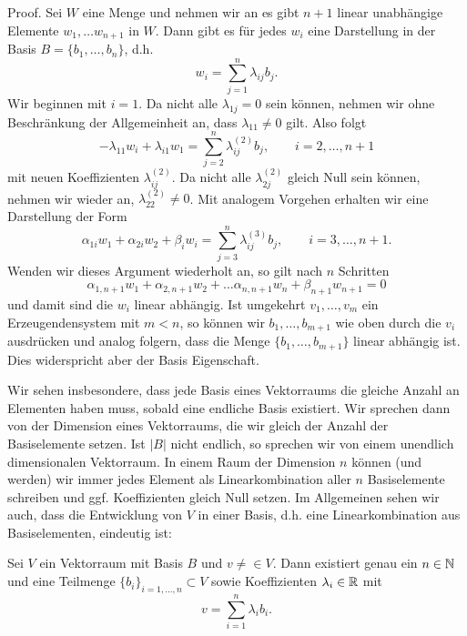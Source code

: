 \begin{emphBox}{}{}
Proof.  Sei \(W\) eine  Menge und nehmen wir an es gibt \(n+1\) linear unabhängige Elemente \(w_1, \ldots w_{n+1}\) in \(W\). Dann gibt es für jedes \(w_i\) eine Darstellung in der Basis \(B=\{b_1,\ldots,b_n\}\), d.h.
\begin{equation*}
 w_i =  \sum_{j=1}^n \lambda_{ij} b_j.
\end{equation*}
Wir beginnen mit \(i=1\). Da nicht alle \(\lambda_{1j} =0 \) sein können, nehmen wir ohne Beschränkung der Allgemeinheit an, dass \(\lambda_{11} \neq 0\) gilt. Also folgt
\begin{equation*}
 - \lambda_{11} w_i + \lambda_{i1} w_1 = \sum_{j=2}^n \lambda_{ij}^{(2)}  b_j, \qquad i=2,\ldots,n+1
\end{equation*}
mit neuen Koeffizienten \(\lambda_{ij}^{(2)}\). Da nicht alle \(\lambda_{2j}^{(2)} \) gleich Null sein können, nehmen wir wieder an, \(\lambda_{22}^{(2)} \neq 0\). Mit analogem Vorgehen erhalten wir eine Darstellung der Form
\begin{equation*}
 \alpha_{1i} w_1 + \alpha_{2i} w_2 + \beta_i w_i = \sum_{j=3}^n \lambda_{ij}^{(3)}  b_j, \qquad i=3,\ldots,n+1.
\end{equation*}
Wenden wir dieses Argument wiederholt an, so gilt nach \(n\) Schritten
\begin{equation*}
 \alpha_{1,n+1} w_1 + \alpha_{2,n+1} w_2 + \ldots \alpha_{n,n+1} w_n + \beta_{n+1} w_{n+1} = 0
\end{equation*}
und damit sind die \(w_i\) linear abhängig.
Ist umgekehrt \(v_1, \ldots, v_m\) ein Erzeugendensystem mit \(m<n\), so können wir \(b_1,\ldots,b_{m+1}\) wie oben durch die \(v_i\) ausdrücken und analog folgern, dass die Menge \(\{b_1,\ldots,b_{m+1}\}\) linear abhängig ist. Dies widerspricht aber der Basis Eigenschaft.
\end{emphBox}

Wir sehen insbesondere, dass jede Basis eines Vektorraums die gleiche Anzahl an Elementen haben muss, sobald eine endliche Basis existiert. Wir sprechen dann von der Dimension eines Vektorraums, die wir gleich der Anzahl der Basiselemente setzen. Ist \(|B|\) nicht endlich, so sprechen wir von einem unendlich dimensionalen Vektorraum. In einem Raum der Dimension \(n\) können (und werden) wir immer jedes Element als Linearkombination aller \(n\) Basiselemente schreiben und ggf. Koeffizienten gleich Null setzen.
Im Allgemeinen sehen wir auch, dass die Entwicklung von \(V\) in einer Basis, d.h. eine Linearkombination aus Basiselementen, eindeutig ist:
\label{vektorraeume/vektorraeume:theorem-11}
\begin{theorem}{}{}



Sei \(V\) ein Vektorraum mit Basis \(B\) und \(v \neq \in V\). Dann existiert genau ein \(n \in \mathbb{N}\) und eine Teilmenge \(\{b_i\}_{i=1,\ldots,n} \subset V\) sowie Koeffizienten \(\lambda_i \in \mathbb{R}\) mit
\begin{equation*}
 v =  \sum_{i=1}^n \lambda_i b_i .
\end{equation*}\end{theorem}


